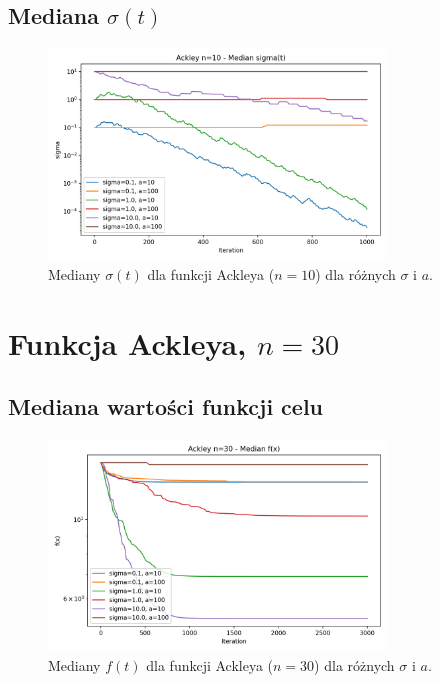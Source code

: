 \documentclass[a4paper,12pt]{article}
\begin{document}
\subsection{Mediana $\sigma(t)$}
\begin{figure}[H]
    \centering
    \includegraphics[width=0.8\textwidth]{charts/Ackley_n10_all_sigmas.png}
    \caption{Mediany $\sigma(t)$ dla funkcji Ackleya ($n=10$) dla różnych $\sigma$ i $a$.}
\end{figure}

\section{Funkcja Ackleya, $n=30$}
\subsection{Mediana wartości funkcji celu}
\begin{figure}[H]
    \centering
    \includegraphics[width=0.8\textwidth]{charts/Ackley_n30_all_medians.png}
    \caption{Mediany $f(t)$ dla funkcji Ackleya ($n=30$) dla różnych $\sigma$ i $a$.}
\end{figure}
\end{document}
